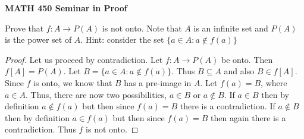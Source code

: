 \documentclass[14pt, fullpage]{article}
\begin{document}
\begin{center}
		
{\bf MATH 450 Seminar in Proof}
 \\
\end{center}
	Prove that $f:A \rightarrow P(A)$ is not onto. Note that $A$ is an infinite set and $P(A)$ is the power set of $A$. Hint: consider the set $\{a \in A: a \notin f(a)\}$
\begin{proof}
	Let us proceed by contradiction. Let $f:A \rightarrow P(A)$ be onto. Then $f[A] = P(A)$. Let $B = \{a \in A: a \notin f(a)\}$. Thus $B \subseteq A$ and also $B \in f[A]$. Since $f$ is onto, we know that $B$ has a pre-image in $A$. Let $f(a) = B$, where $a \in A$. Thus, there are now two possibilities, $a \in B$ or $a \notin B$. If $a \in B$ then by definition $a \notin f(a)$ but then since $f(a) = B$ there is a contradiction. If $a \notin B$ then by definition $a \in f(a)$ but then since $f(a) = B$ then again there is a contradiction. Thus $f$ is not onto.
\end{proof}
\end{document}
